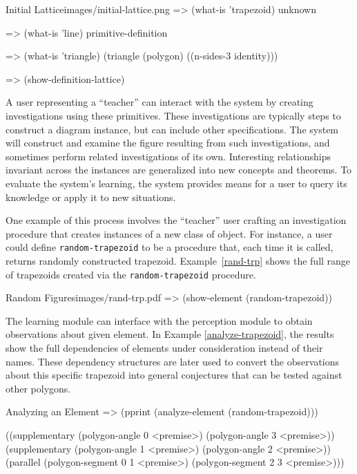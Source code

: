 \begin{img-example}
[label=initial-lattice,
breakable=false]
{Initial Lattice}{images/initial-lattice.png}
=> (what-is 'trapezoid)
unknown

=> (what-is 'line)
primitive-definition

=> (what-is 'triangle)
(triangle (polygon)
          ((n-sides-3 identity)))

=> (show-definition-lattice)
\end{img-example}

A user representing a ``teacher'' can interact with the system by
creating investigations using these primitives. These investigations
are typically steps to construct a diagram instance, but can include
other specifications. The system will construct and examine the figure
resulting from such investigations, and sometimes perform related
investigations of its own. Interesting relationships invariant across
the instances are generalized into new concepts and theorems. To
evaluate the system's learning, the system provides means for a user
to query its knowledge or apply it to new situations.

One example of this process involves the ``teacher'' user crafting an
investigation procedure that creates instances of a new class of
object. For instance, a user could define \texttt{random-trapezoid} to
be a procedure that, each time it is called, returns randomly
constructed trapezoid. Example~\ref{rand-trp} shows the full range of
trapezoids created via the \texttt{random-trapezoid} procedure.

\begin{pdf-example}
[label=rand-trp,
comment style={frame hidden,opacityback=0,
raster columns=3,graphics pages={1,2,3}}]
{Random Figures}{images/rand-trp.pdf}
=> (show-element (random-trapezoid))
\end{pdf-example}

The learning module can interface with the perception module to obtain
observations about given element. In Example \ref{analyze-trapezoid},
the results show the full dependencies of elements under consideration
instead of their names. These dependency structures are later used to
convert the observations about this specific trapezoid into general
conjectures that can be tested against other polygons.

\begin{repl-example}
[label=analyze-trapezoid]
{Analyzing an Element}
=> (pprint (analyze-element (random-trapezoid)))

((supplementary (polygon-angle 0 <premise>) (polygon-angle 3 <premise>))
 (supplementary (polygon-angle 1 <premise>) (polygon-angle 2 <premise>))
 (parallel (polygon-segment 0 1 <premise>) (polygon-segment 2 3 <premise>)))
\end{repl-example}


